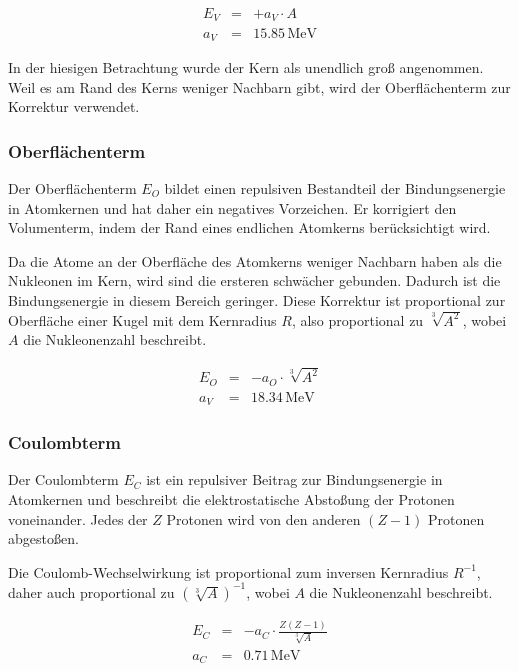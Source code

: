 \documentclass[12pt,a4paper]{scrartcl}
\numberwithin{equation}{section} %
\renewcommand{\[}{} %
\renewcommand{\]}{\noindent} %
\begin{document}
\[
\begin{eqnarray}
        E_V &=& + a_V\cdot A \\
        a_V &=& 15.85\mathrm{\,MeV}
\end{eqnarray}
\]

In der hiesigen Betrachtung wurde der Kern als unendlich groß
angenommen. Weil es am Rand des Kerns weniger Nachbarn gibt, wird der
Oberflächenterm zur Korrektur verwendet.

\hypertarget{oberfluxe4chenterm}{%
\subsubsection{Oberflächenterm}\label{oberfluxe4chenterm}}

Der Oberflächenterm \(E_O\) bildet einen repulsiven Bestandteil der
Bindungsenergie in Atomkernen und hat daher ein negatives Vorzeichen. Er
korrigiert den Volumenterm, indem der Rand eines endlichen Atomkerns
berücksichtigt wird.

Da die Atome an der Oberfläche des Atomkerns weniger Nachbarn haben als
die Nukleonen im Kern, wird sind die ersteren schwächer gebunden.
Dadurch ist die Bindungsenergie in diesem Bereich geringer. Diese
Korrektur ist proportional zur Oberfläche einer Kugel mit dem Kernradius
\(R\), also proportional zu \(\sqrt[3]{A^2}\), wobei \(A\) die
Nukleonenzahl beschreibt.

\[
\begin{eqnarray}
        E_O &=& - a_O\cdot \sqrt[3]{A^2} \\
        a_V &=& 18.34\mathrm{\,MeV}
\end{eqnarray}
\]

\hypertarget{coulombterm}{%
\subsubsection{Coulombterm}\label{coulombterm}}

Der Coulombterm \(E_C\) ist ein repulsiver Beitrag zur Bindungsenergie
in Atomkernen und beschreibt die elektrostatische Abstoßung der Protonen
voneinander. Jedes der \(Z\) Protonen wird von den anderen \((Z-1)\)
Protonen abgestoßen.

Die Coulomb-Wechselwirkung ist proportional zum inversen Kernradius
\(R^{-1}\), daher auch proportional zu \((\sqrt[3]{A})^{-1}\), wobei
\(A\) die Nukleonenzahl beschreibt.

\[
\begin{eqnarray}
        E_C &=& - a_C\cdot \frac{Z(Z-1)}{\sqrt[3]{A}} \\
        a_C &=& 0.71\mathrm{\,MeV}
\end{eqnarray}
\]
\end{document}
